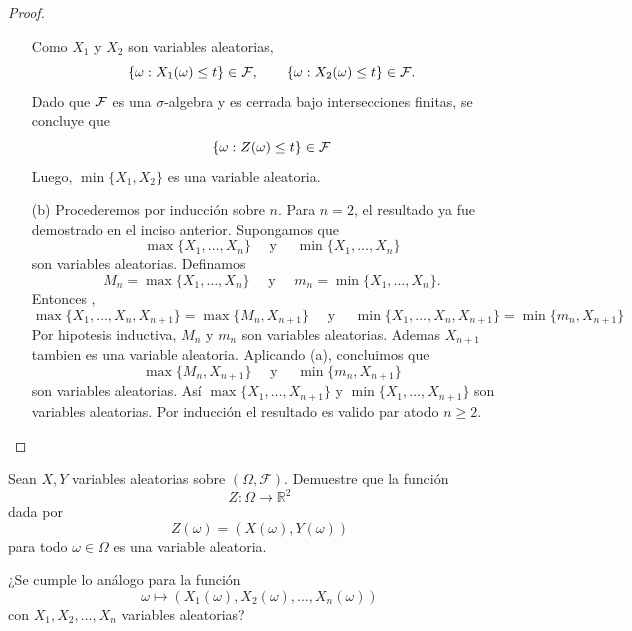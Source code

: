 \documentclass[12pt,a4paper]{article}
\begin{document}
\begin{proof}
\begin{enumerate}
\begin{equation*}
            \end{equation*}
            Como $X_{1}$ y $X_{2}$ son variables aleatorias,
            \begin{equation*}
                \{\omega:X_{1}(\omega)\leq t\}\in\FF,\qquad \{\omega:X_{2}(\omega)\leq t\}\in\FF.
            \end{equation*}
            Dado que $\FF$ es una $\sigma$-algebra y es cerrada bajo intersecciones finitas, se concluye que
            \begin{equation*}
                \{\omega: Z(\omega)\leq t\}\in\FF
            \end{equation*}
            Luego, $\min\{X_{1},X_{2}\}$ es una variable aleatoria.
            \item[(b)] Procederemos por inducción sobre $n$. Para $n=2$, el resultado ya fue demostrado en el inciso anterior.
            Supongamos que
            \begin{equation*}
                \max\{X_{1},\dots,X_{n}\}\quad\text{ y }\quad\min\{X_{1},\dots,X_{n}\}
            \end{equation*}
            son variables aleatorias. Definamos
            \begin{equation*}
                M_{n}=\max\{X_{1},\dots,X_{n}\}\quad\text{ y }\quad m_{n}=\min\{X_{1},\dots,X_{n}\}.
            \end{equation*}
            Entonces ,
            \begin{equation*}
                \max\{X_{1},\dots,X_{n},X_{n+1}\}=\max\{M_{n},X_{n+1}\}\quad\text{ y }\quad\min\{X_{1},\dots,X_{n},X_{n+1}\}=\min\{m_{n},X_{n+1}\}
            \end{equation*}
            Por hipotesis inductiva, $M_{n}$ y $m_{n}$ son variables aleatorias. Ademas $X_{n+1}$ tambien es una variable
            aleatoria. Aplicando (a), concluimos que
            \begin{equation*}
                \max\{M_{n},X_{n+1}\}\quad\text{ y }\quad\min\{m_{n},X_{n+1}\}
            \end{equation*}
            son variables aleatorias. Así $\max\{X_{1},\dots,X_{n+1}\}$ y $\min\{X_{1},\dots,X_{n+1}\}$ son variables
            aleatorias. Por inducción el resultado es valido par atodo $n\geq2$.
        \end{enumerate}
    \end{proof}

    \begin{mdframed}[style=mdpinkbox,frametitle={Ejercicio 2}]
        Sean $X,Y$ variables aleatorias sobre $(\Omega,\mathcal{F})$. Demuestre que la función
        \[
        Z:\Omega\to\mathbb{R}^{2}
        \]
        dada por
        \[
        Z(\omega)=(X(\omega),Y(\omega))
        \]
        para todo $\omega\in\Omega$ es una variable aleatoria.

        ¿Se cumple lo análogo para la función
        \[
        \omega\longmapsto (X_{1}(\omega),X_{2}(\omega),\ldots,X_{n}(\omega))
        \]
        con $X_{1},X_{2},\ldots,X_{n}$ variables aleatorias?
    \end{mdframed}
\end{document}

